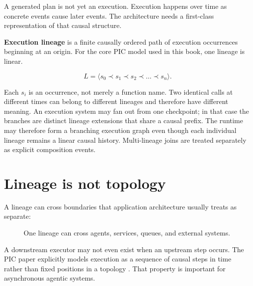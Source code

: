 \documentclass[10pt,oneside,openany]{book}
\newcommand{\term}[1]{\textbf{#1}}
\begin{document}
A generated plan is not yet an execution. Execution happens over time as concrete events cause later events. The architecture needs a first-class representation of that causal structure.

\term{Execution lineage} is a finite causally ordered path of execution occurrences beginning at an origin. For the core PIC model used in this book, one lineage is linear.
\begin{formulabox}
\[
L = \langle s_0 \prec s_1 \prec s_2 \prec \dots \prec s_n \rangle.
\]
\end{formulabox}
Each \(s_i\) is an occurrence, not merely a function name. Two identical calls at different times can belong to different lineages and therefore have different meaning. An execution system may fan out from one checkpoint; in that case the branches are distinct lineage extensions that share a causal prefix. The runtime may therefore form a branching execution graph even though each individual lineage remains a linear causal history. Multi-lineage joins are treated separately as explicit composition events.

\section{Lineage is not topology}
A lineage can cross boundaries that application architecture usually treats as separate:

\begin{figure}[ht]
\centering
{}
\caption{One lineage can cross agents, services, queues, and external systems.}
\end{figure}

A downstream executor may not even exist when an upstream step occurs. The PIC paper explicitly models execution as a sequence of causal steps in time rather than fixed positions in a topology \cite{gallo2026pic}. That property is important for asynchronous agentic systems.
\end{document}

